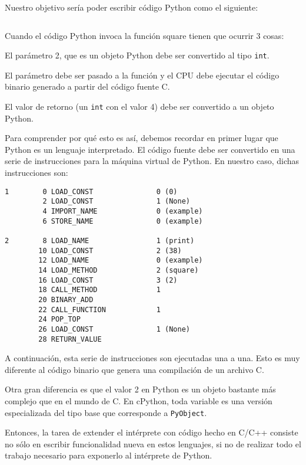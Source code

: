 \documentclass[]{article}
\begin{document}
\inputminted{c}{codelistings/square.cc}

Nuestro objetivo sería poder escribir código Python como el siguiente:

\inputminted{Python}{codelistings/square_usage.py}

Cuando el código Python invoca la función square tienen que ocurrir 3 cosas:


El parámetro 2, que es un objeto Python debe ser convertido al tipo \verb!int!.

El parámetro debe ser pasado a la función y el CPU debe ejecutar el código
binario generado a partir del código fuente C.

El valor de retorno (un \verb!int! con el valor 4) debe ser convertido a un objeto
Python.

Para comprender por qué esto es así, debemos recordar en primer lugar que
Python es un lenguaje interpretado. El código fuente debe ser convertido en una
serie de instrucciones para la máquina virtual de Python. En nuestro caso,
dichas instrucciones son:

\begin{verbatim}
1        0 LOAD_CONST               0 (0)
         2 LOAD_CONST               1 (None)
         4 IMPORT_NAME              0 (example)
         6 STORE_NAME               0 (example)

2        8 LOAD_NAME                1 (print)
        10 LOAD_CONST               2 (38)
        12 LOAD_NAME                0 (example)
        14 LOAD_METHOD              2 (square)
        16 LOAD_CONST               3 (2)
        18 CALL_METHOD              1
        20 BINARY_ADD
        22 CALL_FUNCTION            1
        24 POP_TOP
        26 LOAD_CONST               1 (None)
        28 RETURN_VALUE
\end{verbatim}

A continuación, esta serie de instrucciones son ejecutadas una a una. Esto es
muy diferente al código binario que genera una compilación de un archivo C.

Otra gran diferencia es que el valor 2 en Python es un objeto bastante más
complejo que en el mundo de C. En cPython, toda variable es una versión
especializada del tipo base que corresponde a \verb!PyObject!.

Entonces, la tarea de extender el intérprete con código hecho en C/C++ consiste
no sólo en escribir funcionalidad nueva en estos lenguajes, si no de realizar
todo el trabajo necesario para exponerlo al intérprete de Python.
\end{document}
